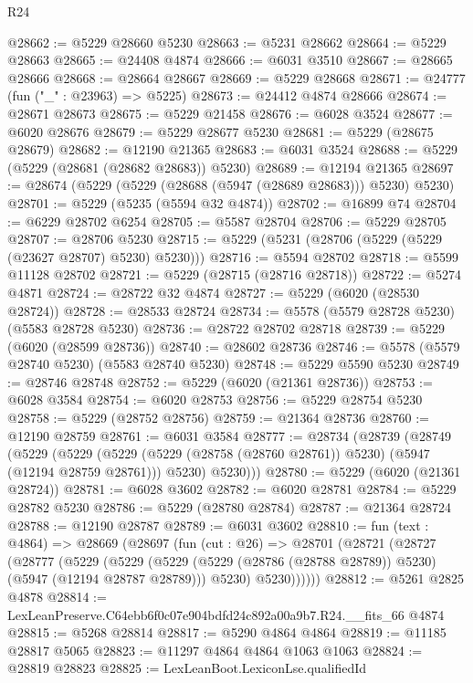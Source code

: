 \begin{lexlean}{R24}
\begin{coremodule}
@28662 := @5229 @28660 @5230
@28663 := @5231 @28662
@28664 := @5229 @28663
@28665 := @24408 @4874
@28666 := @6031 @3510
@28667 := @28665 @28666
@28668 := @28664 @28667
@28669 := @5229 @28668
@28671 := @24777 (fun ("_" : @23963) => @5225)
@28673 := @24412 @4874 @28666
@28674 := @28671 @28673
@28675 := @5229 @21458
@28676 := @6028 @3524
@28677 := @6020 @28676
@28679 := @5229 @28677 @5230
@28681 := @5229 (@28675 @28679)
@28682 := @12190 @21365
@28683 := @6031 @3524
@28688 := @5229 (@5229 (@28681 (@28682 @28683)) @5230)
@28689 := @12194 @21365
@28697 := @28674 (@5229 (@5229 (@28688 (@5947 (@28689 @28683))) @5230) @5230)
@28701 := @5229 (@5235 (@5594 @32 @4874))
@28702 := @16899 @74
@28704 := @6229 @28702 @6254
@28705 := @5587 @28704
@28706 := @5229 @28705
@28707 := @28706 @5230
@28715 := @5229 (@5231 (@28706 (@5229 (@5229 (@23627 @28707) @5230) @5230)))
@28716 := @5594 @28702
@28718 := @5599 @11128 @28702
@28721 := @5229 (@28715 (@28716 @28718))
@28722 := @5274 @4871
@28724 := @28722 @32 @4874
@28727 := @5229 (@6020 (@28530 @28724))
@28728 := @28533 @28724
@28734 := @5578 (@5579 @28728 @5230) (@5583 @28728 @5230)
@28736 := @28722 @28702 @28718
@28739 := @5229 (@6020 (@28599 @28736))
@28740 := @28602 @28736
@28746 := @5578 (@5579 @28740 @5230) (@5583 @28740 @5230)
@28748 := @5229 @5590 @5230
@28749 := @28746 @28748
@28752 := @5229 (@6020 (@21361 @28736))
@28753 := @6028 @3584
@28754 := @6020 @28753
@28756 := @5229 @28754 @5230
@28758 := @5229 (@28752 @28756)
@28759 := @21364 @28736
@28760 := @12190 @28759
@28761 := @6031 @3584
@28777 := @28734
    (@28739
      (@28749
        (@5229
          (@5229
            (@5229 (@5229 (@28758 (@28760 @28761)) @5230) (@5947 (@12194 @28759 @28761)))
            @5230)
          @5230)))
@28780 := @5229 (@6020 (@21361 @28724))
@28781 := @6028 @3602
@28782 := @6020 @28781
@28784 := @5229 @28782 @5230
@28786 := @5229 (@28780 @28784)
@28787 := @21364 @28724
@28788 := @12190 @28787
@28789 := @6031 @3602
@28810 := fun (text : @4864) =>
  @28669
    (@28697
      (fun (cut : @26) =>
      @28701
        (@28721
          (@28727
            (@28777
              (@5229
                (@5229
                  (@5229 (@5229 (@28786 (@28788 @28789)) @5230) (@5947 (@12194 @28787 @28789)))
                  @5230)
                @5230))))))
@28812 := @5261 @2825 @4878
@28814 := LexLeanPreserve.C64ebb6f0c07e904bdfd24c892a00a9b7.R24.__fits_66 @4874
@28815 := @5268 @28814
@28817 := @5290 @4864 @4864
@28819 := @11185 @28817 @5065
@28823 := @11297 @4864 @4864 @1063 @1063
@28824 := @28819 @28823
@28825 := LexLeanBoot.LexiconLse.qualifiedId

\end{coremodule}
\end{lexlean}
